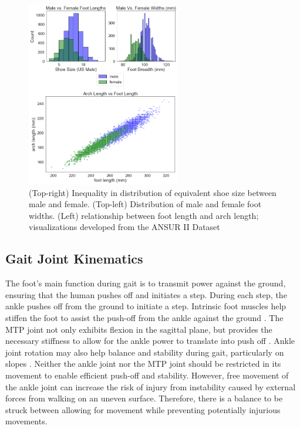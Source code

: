 \documentclass[defaultstyle,11pt]{comps}
\providecommand{\DIFaddbeginFL}{} %
\providecommand{\DIFaddendFL}{} %
\providecommand{\DIFdelbeginFL}{} %
\providecommand{\DIFdelendFL}{} %
\newcommand{\DIFscaledelfig}{0.5}
\newlength{\DIFdelgraphicswidth} %
\newlength{\DIFdelgraphicsheight} %
\newcommand{\DIFaddincludegraphics}[2][]{{\color{blue}\fbox{\DIFOincludegraphics[#1]{#2}}}} %
\newcommand{\DIFdelincludegraphics}[2][]{%
\sbox{\DIFdelgraphicsbox}{\DIFOincludegraphics[#1]{#2}}%
\settoboxwidth{\DIFdelgraphicswidth}{\DIFdelgraphicsbox} %
\settoboxtotalheight{\DIFdelgraphicsheight}{\DIFdelgraphicsbox} %
\scalebox{\DIFscaledelfig}{%
\parbox[b]{\DIFdelgraphicswidth}{\usebox{\DIFdelgraphicsbox}\\[-\baselineskip] \rule{\DIFdelgraphicswidth}{0em}}\llap{\resizebox{\DIFdelgraphicswidth}{\DIFdelgraphicsheight}{%
\setlength{\unitlength}{\DIFdelgraphicswidth}%
\begin{picture}(1,1)%
\thicklines\linethickness{2pt} %
{\color[rgb]{1,0,0}\put(0,0){\framebox(1,1){}}}%
{\color[rgb]{1,0,0}\put(0,0){\line( 1,1){1}}}%
{\color[rgb]{1,0,0}\put(0,1){\line(1,-1){1}}}%
\end{picture}%
}\hspace*{3pt}}} %
} %
\DeclareRobustCommand{\DIFaddbeginFL}{\DIFOaddbeginFL \let\includegraphics\DIFaddincludegraphics} %
\DeclareRobustCommand{\DIFaddendFL}{\DIFOaddendFL \let\includegraphics\DIFOincludegraphics} %
\DeclareRobustCommand{\DIFdelbeginFL}{\DIFOdelbeginFL \let\includegraphics\DIFdelincludegraphics} %
\DeclareRobustCommand{\DIFdelendFL}{\DIFOaddendFL \let\includegraphics\DIFOincludegraphics} %
\begin{document}
\begin{figure}
\DIFdelbeginFL %
\DIFdelendFL \DIFaddbeginFL \hypertarget{fig:SA3-ANSUR}{%
\centering
\includegraphics[width=0.6\textwidth,height=\textheight]{../fig/SA3/ANSUR.png}
\caption{(Top-right) Inequality in distribution of equivalent shoe size between male and female. (Top-left) Distribution of male and female foot widths. (Left) relationship between foot length and arch length; visualizations developed from the ANSUR II Dataset}\label{fig:SA3-ANSUR}
}
\DIFaddendFL \end{figure}

\hypertarget{gait-joint-kinematics}{%
\subsection{Gait Joint Kinematics}\label{gait-joint-kinematics}}

The foot's main function during gait is to transmit power against the ground, ensuring that the human pushes off and initiates a step.
During each step, the ankle pushes off from the ground to initiate a step.
Intrinsic foot muscles help stiffen the foot to assist the push-off from the ankle against the ground \citep{Farris2019}.
The MTP joint not only exhibits flexion in the sagittal plane, but provides the necessary stiffness to allow for the ankle power to translate into push off \citep{Stefanyshyn1997}.
Ankle joint rotation may also help balance and stability during gait, particularly on slopes \citep{Wannop2014}. Neither the ankle joint nor the MTP joint should be restricted in its movement to enable efficient push-off and stability.
However, free movement of the ankle joint can increase the risk of injury from instability caused by external forces from walking on an uneven surface.
Therefore, there is a balance to be struck between allowing for movement while preventing potentially injurious movements.
\end{document}
